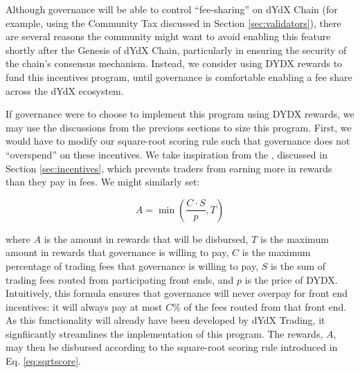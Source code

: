         Although governance will be able to control ``fee-sharing'' on dYdX Chain (for example, using the Community Tax discussed in Section \ref{sec:validators}), there are several reasons the community might want to avoid enabling this feature shortly after the Genesis of dYdX Chain, particularly in ensuring the security of the chain's consensus mechanism. Instead, we consider using DYDX rewards to fund this incentives program, until governance is comfortable enabling a fee share across the dYdX ecosystem. 
        
        If governance were to choose to implement this program using DYDX rewards, we may use the discussions from the previous sections to size this program. First, we would have to modify our square-root scoring rule such that governance does not ``overspend'' on these incentives. We take inspiration from the , discussed in Section \ref{sec:incentives}, which prevents traders from earning more in rewards than they pay in fees. We might similarly set:

        \begin{equation}
            A = \min{\left(\frac{C \cdot S}{p}, T \right)}
        \end{equation}

        where $A$ is the amount in rewards that will be disbursed, $T$ is the maximum amount in rewards that governance is willing to pay, $C$ is the maximum percentage of trading fees that governance is willing to pay, $S$ is the sum of trading fees routed from participating front ends, and $p$ is the price of DYDX. Intuitively, this formula ensures that governance will never overpay for front end incentives: it will always pay at most $C\%$ of the fees routed from that front end. As this functionality will already have been developed by dYdX Trading, it signfiicantly streamlines the implementation of this program. The rewards, $A$, may then be disbursed according to the square-root scoring rule introduced in Eq. \ref{eq:sqrtscore}. 

